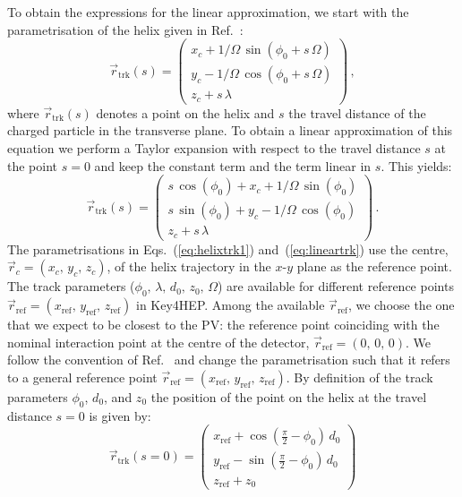 \documentclass[a4paper,english,11pt]{article}
\newcommand{\trk}{\ensuremath{\textrm{trk}}\xspace}
\newcommand{\refpt}{\ensuremath{\textrm{ref}}\xspace}
\begin{document}
	To obtain the expressions for the linear approximation, we start with the parametrisation of the helix given in Ref.~\cite{Kuhr:1998jk}:
	\begin{equation}
		\vec{r}_{\trk}(s) = \begin{pmatrix}
			x_c + 1/\Omega \, \sin(\phi_0 + s \, \Omega) \\
			y_c - 1/\Omega \, \cos(\phi_0 + s \, \Omega) \\
			z_c + s \, \lambda
		\end{pmatrix}
		\, ,
		\label{eq:helixtrk1}
	\end{equation}
	where $\vec{r}_{\trk}(s)$ denotes a point on the helix and $s$ the travel distance of the charged particle in the transverse plane.
	To obtain a linear approximation of this equation we perform a Taylor expansion with respect to the travel distance $s$ at the point $s = 0$ and keep the constant term and the term linear in $s$. This yields:
	\begin{equation}
		\vec{r}_{\trk}(s) = \begin{pmatrix}
			s \, \cos(\phi_0) + x_{c} + 1/\Omega \, \sin(\phi_0) \\
			s \, \sin(\phi_0) + y_{c} - 1/\Omega \, \cos(\phi_0) \\
			z_c + s \, \lambda
		\end{pmatrix}
		\, .
		\label{eq:lineartrk}
	\end{equation}
The parametrisations in Eqs.~(\ref{eq:helixtrk1}) and~(\ref{eq:lineartrk}) use the centre, $\vec{r}_{c} = (x_{c},\,y_{c},\,z_{c})$, of the helix trajectory in the $x$-$y$ plane as the reference point.
The track parameters ($\phi_{0},\,\lambda,\,d_{0},\,z_{0},\,\Omega$) are available for different reference points $\vec{r}_{\refpt} = (x_{\refpt},\,y_{\refpt},\,z_{\refpt})$ in Key4HEP. Among the available $\vec{r}_{\refpt}$, we choose the one that we expect to be closest to the PV: the reference point coinciding with the nominal interaction point at the centre of the detector, $\vec{r}_{\refpt} = (0,\,0,\,0)$.
We follow the convention of Ref.~\cite{Kramer:2006zz} and change the parametrisation such that it refers to a general reference point $\vec{r}_{\refpt} = (x_{\refpt},\,y_{\refpt},\,z_{\refpt})$. By definition of the track parameters $\phi_{0}$, $d_{0}$, and $z_{0}$ the position of the point on the helix at the travel distance $s=0$ is given by:
\begin{equation}
\vec{r}_{\trk}(s=0) = \begin{pmatrix}
	x_{\refpt} + \cos(\frac{\pi}{2} - \phi_0) \, d_0 \\
	y_{\refpt} - \sin(\frac{\pi}{2} - \phi_0) \, d_0 \\
	z_{\refpt} + z_0
\end{pmatrix}
\label{eq:trkats0}
\end{equation}
\end{document}
